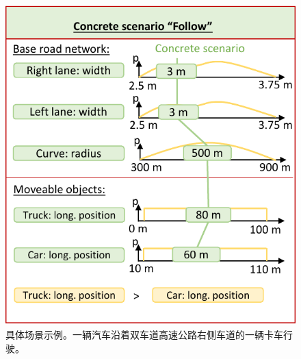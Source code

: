 \begin{figure}
	\centering
	\includegraphics[width=0.9\columnwidth]{./4_terminology/graphics/concreteScenario.pdf}
	\caption{具体场景示例。一辆汽车沿着双车道高速公路右侧车道的一辆卡车行驶。}
	\label{fig:concreteScenario}
\end{figure}

